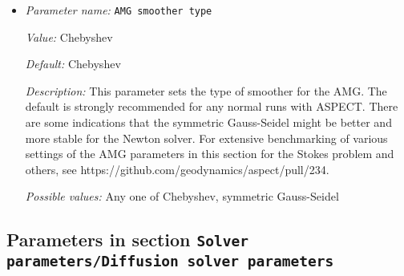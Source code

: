 \begin{itemize}
{\it Default:} 2


{\it Description:} Determines how many sweeps of the smoother should be performed. When the flag elliptic is set to true, (which is true for ASPECT), the polynomial degree of the Chebyshev smoother is set to this value. The term sweeps refers to the number of matrix-vector products performed in the Chebyshev case. In the non-elliptic case, this parameter sets the number of SSOR relaxation sweeps for post-smoothing to be performed. The default is strongly recommended. There are indications that for the Newton solver a different value might be better. For extensive benchmarking of various settings of the AMG parameters in this section for the Stokes problem and others, see https://github.com/geodynamics/aspect/pull/234.


{\it Possible values:} An integer $n$ such that $0\leq n \leq 2147483647$
\item {\it Parameter name:} {\tt AMG smoother type}
\label{parameters:Solver parameters/AMG parameters/AMG smoother type}
\label{parameters:Solver_20parameters/AMG_20parameters/AMG_20smoother_20type}


{\it Value:} Chebyshev


{\it Default:} Chebyshev


{\it Description:} This parameter sets the type of smoother for the AMG. The default is strongly recommended for any normal runs with ASPECT. There are some indications that the symmetric Gauss-Seidel might be better and more stable for the Newton solver. For extensive benchmarking of various settings of the AMG parameters in this section for the Stokes problem and others, see https://github.com/geodynamics/aspect/pull/234.


{\it Possible values:} Any one of Chebyshev, symmetric Gauss-Seidel
\end{itemize}

\subsection{Parameters in section \tt Solver parameters/Diffusion solver parameters}
\label{parameters:Solver_20parameters/Diffusion_20solver_20parameters}

